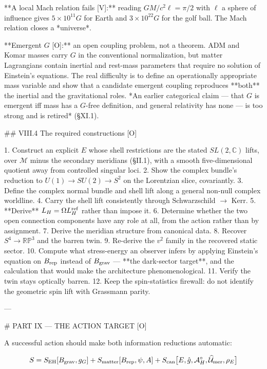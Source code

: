 **A local Mach relation fails [V]:** reading $GM/c^2\ell = \pi/2$ with $\ell$ a sphere of influence gives $5\times10^{11}G$ for Earth and $3\times10^{22}G$ for the golf ball. The Mach relation closes a *universe*.

**Emergent $G$ [O]:** an open coupling problem, not a theorem. ADM and Komar masses carry $G$ in the conventional normalization, but matter Lagrangians contain inertial and rest-mass parameters that require no solution of Einstein's equations. The real difficulty is to define an operationally appropriate mass variable and show that a candidate emergent coupling reproduces **both** the inertial and the gravitational roles. *An earlier categorical claim — that $G$ is emergent iff mass has a $G$-free definition, and general relativity has none — is too strong and is retired* (§XI.1).

## VIII.4 The required constructions [O]

1. Construct an explicit $E$ whose shell restrictions are the stated $SL(2,\mathbb{C})$ lifts, over $\mathcal{M}$ minus the secondary meridians (§II.1), with a smooth five-dimensional quotient away from controlled singular loci.
2. Show the complex bundle's reduction to $U(1)\to SU(2)\to S^2$ on the Lorentzian slice, covariantly.
3. Define the complex normal bundle and shell lift along a general non-null complex worldline.
4. Carry the shell lift consistently through Schwarzschild $\to$ Kerr.
5. **Derive** $L_H = \Omega L_H^{\rm ref}$ rather than impose it.
6. Determine whether the two open connection components have any role at all, from the action rather than by assignment.
7. Derive the meridian structure from canonical data.
8. Recover $S^4\to\mathbb{RP}^3$ and the barren twin.
9. Re-derive the $v^2$ family in the recovered static sector.
10. Compute what stress-energy an observer infers by applying Einstein's equation on $B_{\rm rep}$ instead of $B_{\rm grav}$ — **the dark-sector target**, and the calculation that would make the architecture phenomenological.
11. Verify the twin stays optically barren.
12. Keep the spin-statistics firewall: do not identify the geometric spin lift with Grassmann parity.

---

# PART IX — THE ACTION TARGET [O]

A successful action should make both information reductions automatic:

$$S = S_{\rm EH}[B_{\rm grav},g_G] + S_{\rm matter}[B_{\rm rep},\psi,A] + S_{\rm can}\big[E,\hat g,\mathcal{A}_H^{\circ},\widehat{\mathcal{U} }_{\rm mer},\rho_E\big]$$

